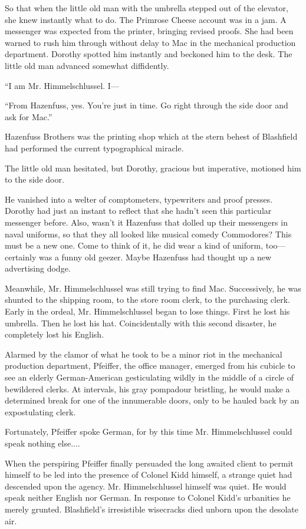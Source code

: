\documentclass[openany,nobib]{tufte-book}
\begin{document}
So that when the little old man with the umbrella stepped out of the
elevator, she knew instantly what to do. The Primrose Cheese account was
in a jam. A messenger was expected from the printer, bringing revised
proofs. She had been warned to rush him through without delay to Mac in
the mechanical production department. Dorothy spotted him instantly and
beckoned him to the desk. The little old man advanced somewhat
diffidently.

``I am Mr. Himmelschlussel. I---

``From Hazenfuss, yes. You're just in time. Go right through the side
door and ask for Mac.''

Hazenfuss Brothers was the printing shop which at the stern behest of
Blashfield had performed the current typographical miracle.

The little old man hesitated, but Dorothy, gracious but imperative,
motioned him to the side door.

He vanished into a welter of comptometers, typewriters and proof
presses. Dorothy had just an instant to reflect that she hadn't seen
this particular messenger before. Also, wasn't it Hazenfuss that dolled
up their messengers in naval uniforms, so that they all looked like
musical comedy Commodores? This must be a new one. Come to think of it,
he did wear a kind of uniform, too---certainly was a funny old geezer.
Maybe Hazenfuss had thought up a new advertising dodge.

Meanwhile, Mr. Himmelschlussel was still trying to find Mac.
Successively, he was shunted to the shipping room, to the store room
clerk, to the purchasing clerk. Early in the ordeal, Mr. Himmelschlussel
began to lose things. First he lost his umbrella. Then he lost his hat.
Coincidentally with this second disaster, he completely lost his
English.

Alarmed by the clamor of what he took to be a minor riot in the
mechanical production department, Pfeiffer, the office manager, emerged
from his cubicle to see an elderly German-American gesticulating wildly
in the middle of a circle of bewildered clerks. At intervals, his gray
pompadour bristling, he would make a determined break for one of the
innumerable doors, only to be hauled back by an expostulating clerk.

Fortunately, Pfeiffer spoke German, for by this time Mr. Himmelschlussel
could speak nothing else....

When the perspiring Pfeiffer finally persuaded the long awaited client
to permit himself to be led into the presence of Colonel Kidd himself, a
strange quiet had descended upon the agency. Mr. Himmelschlussel himself
was quiet. He would speak neither English nor German. In response to
Colonel Kidd's urbanities he merely grunted. Blashfield's irresistible
wisecracks died unborn upon the desolate air.
\end{document}
